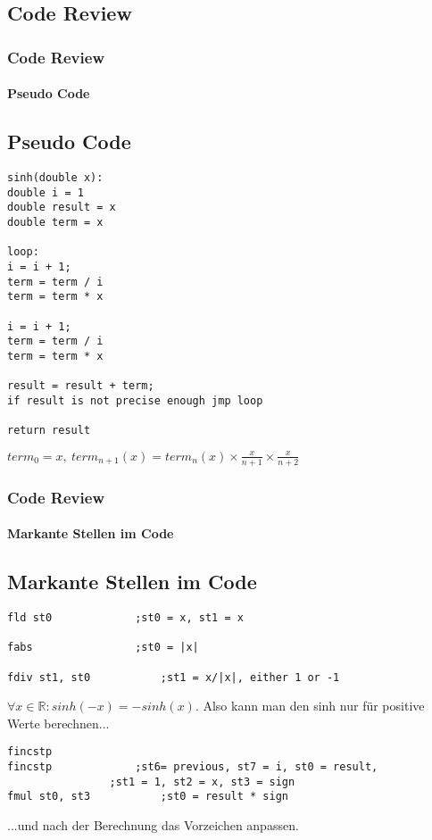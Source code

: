 	\begin{frame}[fragile]
		\section{Code Review}
		\frametitle{Code Review}
		\framesubtitle{Pseudo Code}
		\subsection{Pseudo Code}
\begin{lstlisting}[style=myPseudo, title=Sinh in Pseudocode]
sinh(double x):
double i = 1
double result = x
double term = x

loop:
i = i + 1;
term = term / i
term = term * x

i = i + 1;
term = term / i
term = term * x

result = result + term;
if result is not precise enough jmp loop

return result
\end{lstlisting}
$term_{0} = x, \ term_{n+1}(x) = term_{n}(x) \times \frac{x}{n+1} \times \frac{x}{n+2}$
\end{frame}
\begin{frame}[fragile]
\frametitle{Code Review}
\framesubtitle{Markante Stellen im Code}
\subsection{Markante Stellen im Code}

\begin{lstlisting}[style=myAssembly, title=sinh.asm vor Aufruf der Hauptschleife, firstnumber = 22]
fld st0				;st0 = x, st1 = x

fabs				;st0 = |x|

fdiv st1, st0			;st1 = x/|x|, either 1 or -1
\end{lstlisting}
$\forall x \in \mathbb{R}: sinh(-x) = -sinh(x)$. Also kann man den sinh nur für positive Werte berechnen...
\begin{lstlisting}[style=myAssembly, title=sinh.asm nach Verlassen der Hauptschleife, firstnumber = 82]
fincstp
fincstp				;st6= previous, st7 = i, st0 = result, 
				;st1 = 1, st2 = x, st3 = sign
fmul st0, st3			;st0 = result * sign
\end{lstlisting}
...und nach der Berechnung das Vorzeichen anpassen.
\end{frame}
